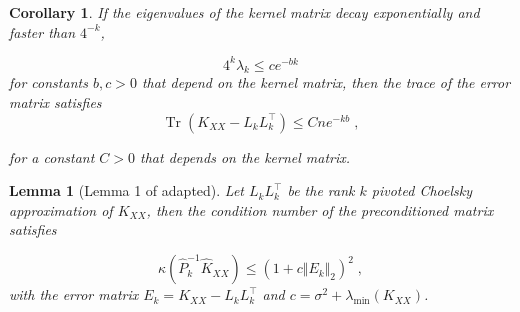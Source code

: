 \documentclass{article}
\newcommand{\norm}[1]{\Vert #1 \Vert}
\DeclareMathOperator{\trace}{Tr}
\newtheorem{corollary}{Corollary}[theorem]
\newtheorem{lemma}[theorem]{Lemma}
\begin{document}
\begin{corollary}
If the eigenvalues of the kernel matrix decay exponentially and faster than $4^{-k}$, 

\begin{equation} \label{eq:kernel_exponential_decay}
    4^k \lambda_k \le c e^{-bk}
\end{equation}
for constants $b, c > 0$ that depend on the kernel matrix, then the trace of the error matrix satisfies
\begin{equation} \label{eq:pivchol_trace_error}
    \trace(K_{XX} - L_k L_k^\top) \le C n e^{-kb} \; ,
\end{equation}

for a constant $C > 0$ that depends on the kernel matrix. 
\end{corollary}

\begin{lemma}[{{Lemma 1 of \cite{gardner_gpytorch_2021} adapted}}] \label{thm:pivchol_condnum}
Let $L_k L_k^\top$ be the rank $k$ pivoted Choelsky approximation of $K_{XX}$, then the condition number of the preconditioned matrix satisfies

\begin{equation} \label{eq:pivchol_condnum}
    \kappa \left( \widehat P_k^{-1} \widehat K_{XX} \right) \le (1 + c \norm{E_k}_2 )^2 \; ,
\end{equation}
with the error matrix $E_k = K_{XX} - L_kL_k^\top$ and $c=\sigma^2 + \lambda_{\min}(K_{XX})$.
\end{lemma}
\end{document}
